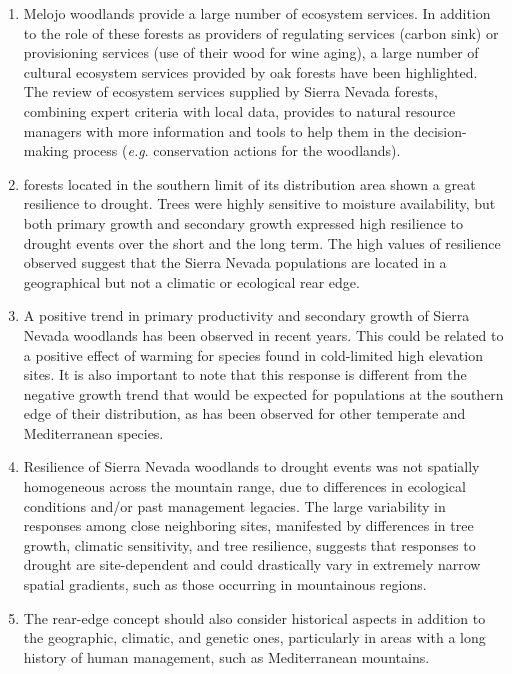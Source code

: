 \begin{enumerate}
    \item Melojo woodlands provide a large number of ecosystem services. In addition to the role of these forests as providers of regulating services (carbon sink) or provisioning services (use of their wood for wine aging), a large number of cultural ecosystem services provided by oak forests have been highlighted. The review of ecosystem services supplied by Sierra Nevada \Qp forests, combining expert criteria with local data, provides to natural resource managers with more information and tools to help them in the decision-making process (\emph{e.g}. conservation actions for the \Qp woodlands).
    
    \item \Qp forests located in the southern limit of its distribution area shown a great resilience to drought. Trees were highly sensitive to moisture availability, but both primary growth and secondary growth expressed high resilience to drought events over the short and the long term. The high values of resilience observed suggest that the Sierra Nevada \Qp populations are located in a geographical but not a climatic or ecological rear edge.
    
    \item A positive trend in primary productivity and secondary growth of Sierra Nevada \Qp woodlands has been observed in recent years. This could be related to a positive effect of warming for species found in cold-limited high elevation sites. It is also important to note that this response is different from the negative growth trend that would be expected for populations at the southern edge of their distribution, as has been observed for other temperate and Mediterranean species. 
    
    \item Resilience of Sierra Nevada \Qp woodlands to drought events was not spatially homogeneous across the mountain range, due to differences in ecological conditions and/or past management legacies. The large variability in responses among close neighboring sites, manifested by differences in tree growth, climatic sensitivity, and tree resilience, suggests that responses to drought are site-dependent and could drastically vary in extremely narrow spatial gradients, such as those occurring in mountainous regions. 

    \item The rear-edge concept should also consider historical aspects in addition to the geographic, climatic, and genetic ones, particularly in areas with a long history of human management, such as Mediterranean mountains.
    
\end{enumerate}